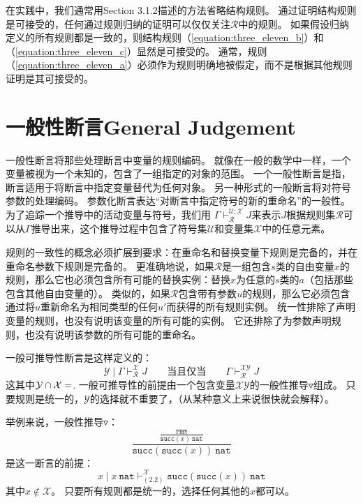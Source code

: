在实践中，我们通常用Section 3.1.2描述的方法省略结构规则。
通过证明结构规则是可接受的，任何通过规则归纳的证明可以仅仅关注$ \mathcal{R} $中的规则。
如果假设归纳定义的所有规则都是一致的，则结构规则（\ref{equation:three_eleven_b}）和（\ref{equation:three_eleven_c}）显然是可接受的。
通常，规则（\ref{equation:three_eleven_a}）必须作为规则明确地被假定，而不是根据其他规则证明是其可接受的。

\section{一般性断言General Judgement}

一般性断言将那些处理断言中变量的规则编码。
就像在一般的数学中一样，一个变量被视为一个未知的，包含了一组指定的对象的范围。
一个一般性断言是指，断言适用于将断言中指定变量替代为任何对象。
另一种形式的一般断言将对符号参数的处理编码。
参数化断言表达“对断言中指定符号的新的重命名”的一般性。
为了追踪一个推导中的活动变量与符号，我们用  $\Gamma \vdash_{\mathcal{R}}^{\mathcal{U};\mathcal{X}} J $来表示$J$根据规则集$\mathcal{R}$可以从$\Gamma$推导出来，这个推导过程中包含了符号集$\mathcal{U}$和变量集$\mathcal{X}$中的任意元素。

规则的一致性的概念必须扩展到要求：在重命名和替换变量下规则是完备的，并在重命名参数下规则是完备的。
更准确地说，如果$ \mathcal{R} $是一组包含$ s $类的自由变量$ x $的规则，那么它也必须包含所有可能的替换实例：替换$ x $为任意的$ s $类的$ a $（包括那些包含其他自由变量的）。
类似的，如果$ \mathcal{R} $包含带有参数$ u $的规则，那么它必须包含通过将$ u $重新命名为相同类型的任何$ u'$而获得的所有规则实例。
统一性排除了声明变量的规则，也没有说明该变量的所有可能的实例。
它还排除了为参数声明规则，也没有说明该参数的所有可能的重命名。

一般可推导性断言是这样定义的：
$$\mathcal{Y} \mid \Gamma \vdash_{\mathcal{R}}^{\mathcal{X}} J \qquad \text{当且仅当} \qquad \Gamma \vdash_{\mathcal{R}}^{\mathcal{XY}}  J$$
这其中$\mathcal{Y} \cap \mathcal{X}=\empty$. 
一般可推导性的前提由一个包含变量$ \mathcal{XY} $的一般性推导$ \triangledown $组成。
只要规则是统一的，$ \mathcal{Y} $的选择就不重要了，（从某种意义上来说很快就会解释）。

举例来说，一般性推导$\triangledown$：
$$\frac{\frac{\frac{}{x \  \mathtt{nat}}}{\mathtt{succ} (x) \  \mathtt{nat}}} {\mathtt{succ} (\mathtt{succ} (x)) \  \mathtt{nat}}$$
是这一断言的前提：
$$x \mid x \ \mathtt{nat} \vdash_{(2.2)}^{\mathcal{X}} \mathtt{succ} (\mathtt{succ} (x)) \ \mathtt{nat}$$
其中$x \notin \mathcal{X}$。
只要所有规则都是统一的，选择任何其他的$ x $都可以。

